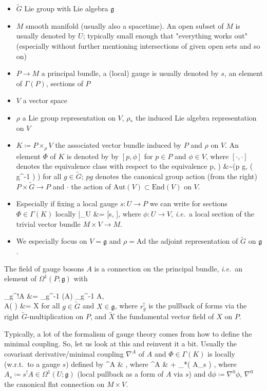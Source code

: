 \documentclass[a4paper,oneside,11pt,bibliography=totoc]{scrartcl}
\def\ba#1\ea{\begin{align}#1\end{align}}
\def\bas#1\eas{\begin{align*}#1\end{align*}}
\theoremstyle{plain}
\theoremstyle{remark}
\theoremstyle{definition}
\begin{document}
\begin{itemize}
	\item $\widetilde{G}$ Lie group with Lie algebra $\mathfrak{g}$
	\item $M$ smooth manifold (usually also a spacetime). An open subset of $M$ is usually denoted by $U$; typically small enough that "everything works out" (especially without further mentioning intersections of given open sets and so on)
	\item $P \to M$ a principal bundle, a (local) gauge is usually denoted by $s$, an element of $\Gamma(P)$, sections of $P$
	\item $V$ a vector space
	\item $\rho$ a Lie group representation on $V$, $\rho_*$ the induced Lie algebra representation on $V$
	\item $K \coloneqq P \times_\rho V$ the associated vector bundle induced by $P$ and $\rho$ on $V$. An element $\Phi$ of $K$ is denoted by by $[p, \phi]$ for $p \in P$ and $\phi \in V$, where $[ \cdot, \cdot]$ denotes the equivalence class with respect to the equivalence
	\bas
		(p, \phi) &\sim \mleft(p g, \rho\mleft( g^{-1} \mright) \cdot \phi \mright)
	\eas
	for all $g \in \widetilde{G}$; $pg$ denotes the canonical group action (from the right) $P \times \widetilde{G} \to P$ and $\cdot$ the action of $\mathrm{Aut}(V) \subset \mathrm{End}(V)$ on $V$.
	\item Especially if fixing a local gauge $s: U \to P$ we can write for sections $\Phi \in \Gamma(K)$ locally 
	\bas
		\Phi|_U
		&=
		[s, \phi],
	\eas
	where $\phi: U \to V$, \textit{i.e.}\ a local section of the trivial vector bundle $M \times V \to M$.
	\item We especially focus on $V = \mathfrak{g}$ and $\rho = \mathrm{Ad}$ the adjoint representation of $\widetilde{G}$ on $\mathfrak{g}$.
\end{itemize}

The field of gauge bosons $A$ is a connection on the principal bundle, \textit{i.e.}\ an element of $\Omega^1(P; \mathfrak{g})$ with

\bas
r_g^!A &= _{g^{-1}} (A) \coloneqq {}_{g^{-1}} \circ A, \\
A\mleft(  \mright) &= X
\eas
for all $g \in \widetilde{G}$ and $X \in \mathfrak{g}$, where $r_g^!$ is the pullback of forms via the right $\widetilde{G}$-multiplication on $P$, and $\widetilde{X}$ the fundamental vector field of $X$ on $P$. 

Typically, a lot of the formalism of gauge theory comes from how to define the minimal coupling. So, let us look at this and reinvent it a bit. Usually the covariant derivative/minimal coupling $\nabla^A$ of $A$ and $\Phi \in \Gamma(K)$ is locally (w.r.t.\ to a gauge $s$) defined by
\bas
\nabla^A \Phi
&\coloneqq
{},
\eas
where
\ba\label{ClassicalMiniCoupling}
\nabla^A \phi
&\coloneqq
{}\phi
	+ \rho_*\mleft( A_s \mright) \cdot \phi,
\ea
where $A_s \coloneqq s^! A \in \Omega^1(U; \mathfrak{g})$ (local pullback as a form of $A$ via $s$) and $\mathrm{d} \phi \coloneqq \nabla^0 \phi$, $\nabla^0$ the canonical flat connection on $M \times V$.
\end{document}
